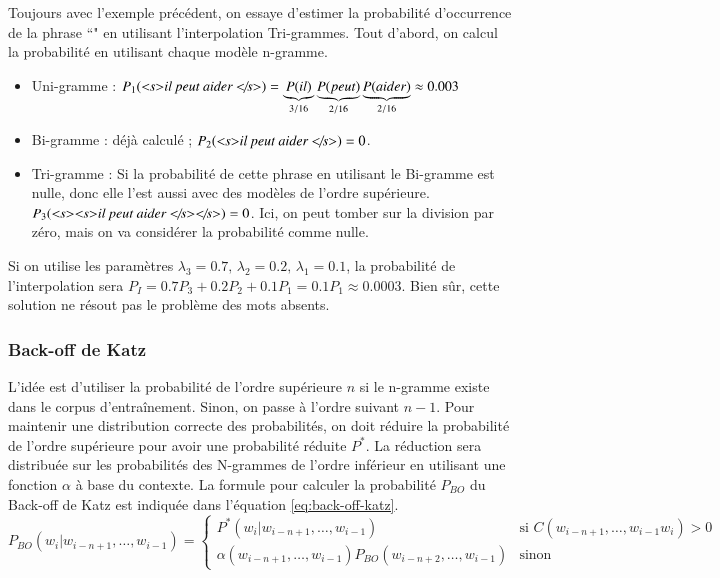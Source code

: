 \documentclass{KodeBook}
\begin{document}
Toujours avec l'exemple précédent, on essaye d'estimer la probabilité d'occurrence de la phrase ``"
en utilisant l'interpolation Tri-grammes.
Tout d'abord, on calcul la probabilité en utilisant chaque modèle n-gramme.
\begin{itemize}
	\item Uni-gramme : 
	$P_1(\text{\textit{\textless s\textgreater il peut aider \textless/s\textgreater}}) = 
	\underbrace{P(il)}_{3/16}
	\underbrace{P(peut)}_{2/16} 
	\underbrace{P(aider)}_{2/16} \approx 0.003$
	
	\item Bi-gramme : déjà calculé ; $P_2(\text{\textit{\textless s\textgreater il peut aider \textless/s\textgreater}})=0$.
	
	\item Tri-gramme : Si la probabilité de cette phrase en utilisant le Bi-gramme est nulle, donc elle l'est aussi avec des modèles de l'ordre supérieure. 
	$P_3(\text{\textit{\textless s\textgreater \textless s\textgreater il peut aider \textless/s\textgreater \textless/s\textgreater}})=0$.
	Ici, on peut tomber sur la division par zéro, mais on va considérer la probabilité comme nulle.
\end{itemize}
%
Si on utilise les paramètres $\lambda_3=0.7,\, \lambda_2=0.2,\, \lambda_1 = 0.1$, la probabilité de l'interpolation sera $P_I = 0.7 P_3 + 0.2 P_2 + 0.1 P_1 = 0.1 P_1 \approx 0.0003$. 
Bien sûr, cette solution ne résout pas le problème des mots absents.

\subsubsection{Back-off de Katz}

L'idée est d'utiliser la probabilité de l'ordre supérieure $n$ si le n-gramme existe dans le corpus d'entraînement. 
Sinon, on passe à l'ordre suivant $n-1$.
Pour maintenir une distribution correcte des probabilités, on doit réduire la probabilité de l'ordre supérieure pour avoir une probabilité réduite $P^*$. 
La réduction sera distribuée sur les probabilités des N-grammes de l'ordre inférieur en utilisant une fonction $\alpha$ à base du contexte.
La formule pour calculer la probabilité $P_{BO}$ du Back-off de Katz est indiquée dans l'équation \ref{eq:back-off-katz}.
\begin{equation}
	P_{BO}(w_i | w_{i-n+1}, \ldots, w_{i-1}) = 
	\begin{cases}
	P^*(w_i | w_{i-n+1}, \ldots, w_{i-1}) & \text{si } C(w_{i-n+1}, \ldots, w_{i-1} w_i) > 0 \\
	\alpha(w_{i-n+1}, \ldots, w_{i-1}) P_{BO}(w_{i-n+2}, \ldots, w_{i-1}) & \text{sinon}
	\end{cases}
	\label{eq:back-off-katz}
\end{equation}
\end{document}
